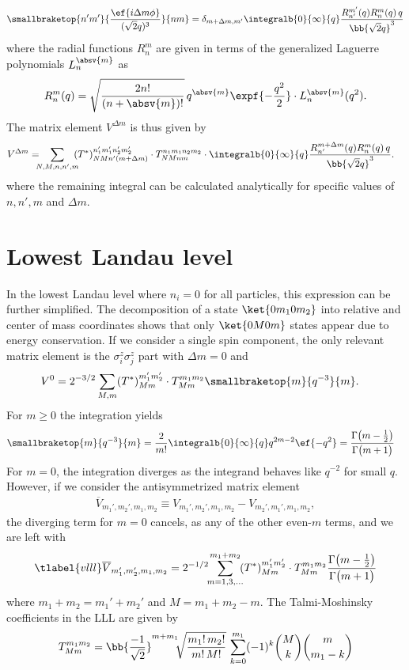 \begin{align}
\smallbraketop{n'm'}{\frac{\ef{i\Delta m \phi}}{(\sqrt{2} q)^3}}{nm} = \delta_{m+\Delta m,m'} \integralb{0}{\infty}{q} \frac{R_{n'}^{m'}(q) R_n^m(q) \,q}{\bb{\sqrt{2} q}^3}
\end{align}
where the radial functions $R_n^m$ are given in terms of the generalized Laguerre polynomials $L_n^{\absv{m}}$ as
\begin{align}
R_n^m(q) = \sqrt{\frac{2n!}{(n+\absv{m})!}}\, q^{\absv{m}}\expf{-\frac{q^2}{2}}\cdot L_n^{\absv{m}}(q^2).
\end{align}
The matrix element $V^{\Delta m}$ is thus given by
\begin{align}
V^{\Delta m}= \!\!\! &\sum_{N,M,n,n',m} \!\!\! (T^*)^{n_1'm_1'n_2'm_2'}_{NMn'(m+\Delta m)} \cdot T^{n_1m_1n_2m_2}_{NMnm} \cdot
 \integralb{0}{\infty}{q} \frac{R_{n'}^{m+\Delta m}(q) R_n^m(q) \,q}{\bb{\sqrt{2} q}^3}.
\end{align}
where the remaining integral can be calculated analytically for specific values of $n,n',m$ and $\Delta m$.

\section{Lowest Landau level}
In the lowest Landau level where $n_i=0$ for all particles, this expression can be further simplified. The decomposition of a state $\ket{0m_10m_2}$ into relative and center of mass coordinates shows that only $\ket{0M0m}$ states appear due to energy conservation. If we consider a single spin component, the only relevant matrix element is the $\sigma^z_i \sigma^z_j$ part with $\Delta m=0$ and
\begin{align}
V^0 &= 2^{-3/2} \sum_{M,m}  (T^*)^{m_1'm_2'}_{Mm} \cdot T^{m_1m_2}_{Mm} \smallbraketop{m}{q^{-3}}{m}.
\end{align}
For $m\ge 0$ the integration yields
\begin{align}
\smallbraketop{m}{q^{-3}}{m} &= \frac{2}{m!} \integralb{0}{\infty}{q} q^{2m-2} \ef{-q^2}
= \frac{\Gamma\big(m-\frac{1}{2}\big)}{\Gamma\big(m+1\big)}
\end{align}
For $m=0$, the integration diverges as the integrand behaves like $q^{-2}$ for small $q$. However, if we consider the antisymmetrized matrix element
\begin{align}
\overline{V}_{m_1',m_2',m_1,m_2} \equiv V_{m_1',m_2',m_1,m_2} - V_{m_2',m_1',m_1,m_2},
\end{align}
the diverging term for $m=0$ cancels, as any of the other even-$m$ terms, and we are left with
\begin{align} \tlabel{vlll}
\overline{V}_{m_1',m_2',m_1,m_2} = 2^{-1/2} \!\! \sum_{m = 1,3,\dots}^{m_1+m_2} \!\! (T^*)^{m_1'm_2'}_{Mm} \cdot T^{m_1m_2}_{Mm} \frac{\Gamma\big(m-\frac{1}{2}\big)}{\Gamma\big(m+1\big)}
\end{align}
where $m_1+m_2 = m_1'+m_2'$ and  $M=m_1+m_2-m$. The Talmi-Moshinsky coefficients in the LLL are given by
\begin{align}
T^{m_1m_2}_{Mm} = \bb{\frac{-1}{\sqrt{2}}}^{m+m_1} \!\! \sqrt{\frac{m_1!\,m_2!}{m!\, M!}} \,\sum_{k=0}^{m_1} (-1)^k \binom{M}{k} \binom{m}{m_1-k}
\end{align}
